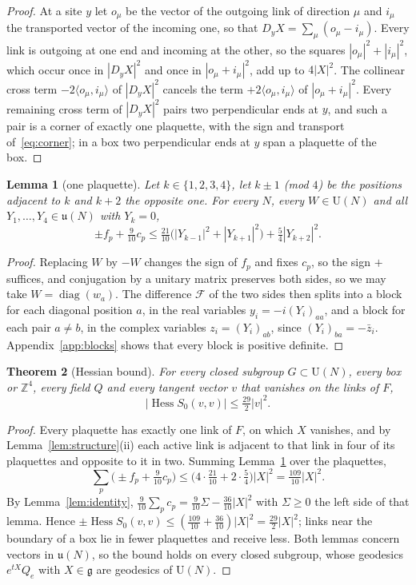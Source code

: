 \documentclass[11pt]{amsart}
\newtheorem{theorem}{Theorem}[section]
\newtheorem{lemma}[theorem]{Lemma}
\theoremstyle{definition}
\theoremstyle{remark}
\numberwithin{equation}{section}
\newcommand{\Z}{\mathbb{Z}}
\newcommand{\U}{\mathrm{U}}
\newcommand{\g}{\mathfrak{g}}
\newcommand{\Hess}{\operatorname{Hess}}
\newcommand{\ip}[2]{\langle #1,#2\rangle}
\begin{document}
\begin{proof}
At a site $y$ let $o_\mu$ be the vector of the outgoing link of direction $\mu$
and $i_\mu$ the transported vector of the incoming one, so that $D_yX=\sum_\mu
(o_\mu-i_\mu)$. Every link is outgoing at one end and incoming at the other, so
the squares $|o_\mu|^2+|i_\mu|^2$, which occur once in $|D_yX|^2$ and once in
$|o_\mu+i_\mu|^2$, add up to $4|X|^2$. The collinear cross term
$-2\ip{o_\mu}{i_\mu}$ of $|D_yX|^2$ cancels the term $+2\ip{o_\mu}{i_\mu}$ of
$|o_\mu+i_\mu|^2$. Every remaining cross term of $|D_yX|^2$ pairs two
perpendicular ends at $y$, and such a pair is a corner of exactly one
plaquette, with the sign and transport of~\eqref{eq:corner}; in a box two
perpendicular ends at $y$ span a plaquette of the box.
\end{proof}

\begin{lemma}[one plaquette]\label{lem:local}
Let $k\in\{1,2,3,4\}$, let $k\pm1$ \textup{(}mod $4$\textup{)} be the
positions adjacent to $k$ and $k+2$ the opposite one. For every $N$, every
$W\in\U(N)$ and all $Y_1,\dots,Y_4\in\mathfrak u(N)$ with $Y_k=0$,
\[
\pm f_p+\tfrac9{10}c_p\le\tfrac{21}{10}\bigl(|Y_{k-1}|^2+|Y_{k+1}|^2\bigr)
+\tfrac54|Y_{k+2}|^2 .
\]
\end{lemma}

\begin{proof}
Replacing $W$ by $-W$ changes the sign of $f_p$ and fixes $c_p$, so the sign
$+$ suffices, and conjugation by a unitary matrix preserves both sides, so we
may take $W=\operatorname{diag}(w_a)$. The difference $\mathcal F$ of the two
sides then splits into a block for each diagonal position $a$, in the real
variables $y_i=-i(Y_i)_{aa}$, and a block for each pair $a\ne b$, in the
complex variables $z_i=(Y_i)_{ab}$, since $(Y_i)_{ba}=-\bar z_i$.
Appendix~\ref{app:blocks} shows that every block is positive definite.
\end{proof}

\begin{theorem}[Hessian bound]\label{thm:hess}
For every closed subgroup $G\subset\U(N)$, every box or $\Z^4$, every field
$Q$ and every tangent vector $v$ that vanishes on the links of $F$,
\[
|\Hess S_0(v,v)|\le\tfrac{29}2|v|^2 .
\]
\end{theorem}

\begin{proof}
Every plaquette has exactly one link of $F$, on which $X$ vanishes, and by
Lemma~\ref{lem:structure}(ii) each active link is adjacent to that link in
four of its plaquettes and opposite to it in two. Summing
Lemma~\ref{lem:local} over the plaquettes,
\[
\sum_p\bigl(\pm f_p+\tfrac9{10}c_p\bigr)\le\bigl(4\cdot\tfrac{21}{10}+2\cdot
\tfrac54\bigr)|X|^2=\tfrac{109}{10}|X|^2 .
\]
By Lemma~\ref{lem:identity}, $\frac9{10}\sum_pc_p=\frac9{10}\Sigma-\frac{36}{10}
|X|^2$ with $\Sigma\ge0$ the left side of that lemma. Hence $\pm\Hess S_0(v,v)
\le(\frac{109}{10}+\frac{36}{10})|X|^2=\frac{29}2|X|^2$; links near the boundary
of a box lie in fewer plaquettes and receive less. Both lemmas concern
vectors in $\mathfrak u(N)$, so the bound holds on every closed subgroup, whose
geodesics $e^{tX}Q_e$ with $X\in\g$ are geodesics of $\U(N)$.
\end{proof}
\end{document}
